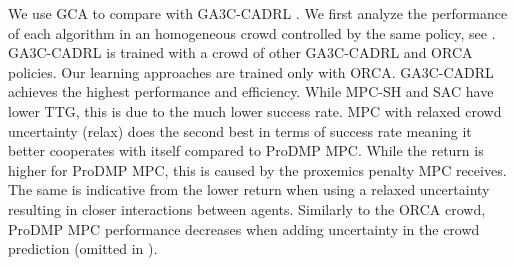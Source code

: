 \documentclass[letterpaper,conference,10pt]{IEEEconf}
\begin{document}
We use GCA to compare with GA3C-CADRL \cite{everett_collision_2021}. We first analyze the performance of each algorithm in an homogeneous crowd controlled by the same policy, see . GA3C-CADRL is trained with a crowd of other GA3C-CADRL and ORCA policies. Our learning approaches are trained only with ORCA. GA3C-CADRL achieves the highest performance and efficiency. While MPC-SH and SAC have lower TTG, this is due to the much lower success rate. MPC with relaxed crowd uncertainty (relax) does the second best in terms of success rate meaning it better cooperates with itself compared to ProDMP MPC. While the return is higher for ProDMP MPC, this is caused by the proxemics penalty MPC receives. The same is indicative from the lower return when using a relaxed uncertainty resulting in closer interactions between agents. Similarly to the ORCA crowd, ProDMP MPC performance decreases when adding uncertainty in the crowd prediction (omitted in ).
\end{document}
